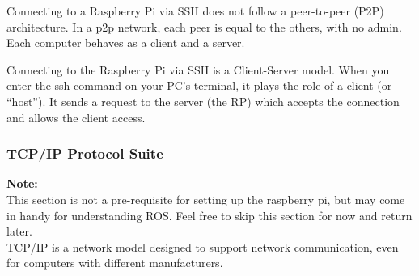 \documentclass[a4paper, 10pt]{article}
\begin{document}
                Connecting to a Raspberry Pi via SSH does not follow a peer-to-peer (P2P) architecture. In a p2p network, each peer is equal to the others, with no admin. Each computer behaves as a client and a server.
                
                Connecting to the Raspberry Pi via SSH is a Client-Server model. When you enter the ssh command on your PC’s terminal, it plays the role of a client (or “host”). It sends a request to the server (the RP) which accepts the connection and allows the client access.

        \subsubsection{TCP/IP Protocol Suite}
            \textbf{Note:}\\
            This section is not a pre-requisite for setting up the raspberry pi, but may come in handy for understanding ROS. Feel free to skip this section for now and return later.\\ 
        
            TCP/IP is a network model designed to support network communication, even for computers with different manufacturers.\\ 
\end{document}

